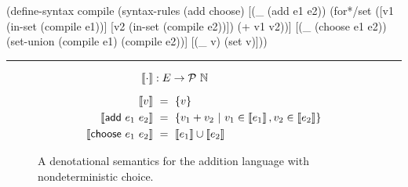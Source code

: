\newsavebox{\compiletwobox}

\begin{lrbox}{\compiletwobox}
\begin{varwidth}[b]{3.5in}
\singlespacing
\centering
\begin{schemedisplay}
(define-syntax compile
  (syntax-rules (add choose)
    [(_ (add e1 e2))
     (for*/set ([v1 (in-set (compile e1))]
                [v2 (in-set (compile e2))])
       (+ v1 v2))]
    [(_ (choose e1 e2))
     (set-union (compile e1) (compile e2))]
    [(_ v)
     (set v)]))
\end{schemedisplay}
\hrule
\end{varwidth}
\end{lrbox}

\begin{figure}[tb]\centering
\begin{varwidth}[b]{\textwidth}
\begin{equation*}
\begin{aligned}[t]
	\left\llbracket{\cdot}\right\rrbracket &: E \to \mathcal{P}~\mathbb{N}
\\[6pt]
	\left\llbracket{v}\right\rrbracket&\ =\ \{{v}\}
\\
	\left\llbracket{\mathsf{add}~e_1~e_2}\right\rrbracket&\ =\ \lbrace {v_1 + v_2} \ \lvert\ {v_1 \in \left\llbracket{e_1}\right\rrbracket, v_2 \in \left\llbracket{e_2}\right\rrbracket} \rbrace
\\
	\left\llbracket{\mathsf{choose}~e_1~e_2}\right\rrbracket&\ =\ \left\llbracket{e_1}\right\rrbracket \cup \left\llbracket{e_2}\right\rrbracket \\
\end{aligned}
\end{equation*}
\end{varwidth}
\bottomhrule
\caption[Denotational semantics with nondeterminism]{A denotational semantics for the addition language with nondeterministic choice.}
\label{fig:add-choose-denotational}
\end{figure}


